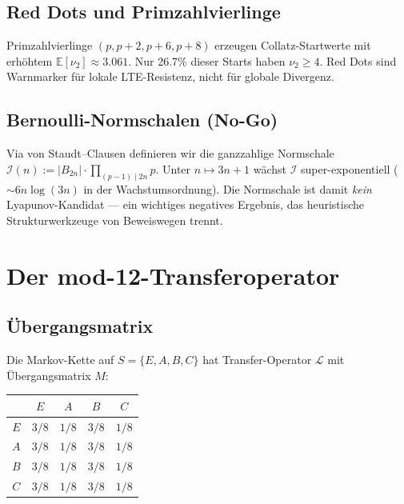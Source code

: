 \documentclass[12pt,a4paper]{article}
\newcommand{\vii}{\nu_2}
\begin{document}
\subsection{Red Dots und Primzahlvierlinge}

Primzahlvierlinge $(p,p+2,p+6,p+8)$ erzeugen Collatz-Startwerte mit
erhöhtem $\mathbb{E}[\vii] \approx 3.061$. Nur 26.7\% dieser Starts haben
$\vii \geq 4$. Red Dots sind Warnmarker für lokale LTE-Resistenz, nicht
für globale Divergenz.

\subsection{Bernoulli-Normschalen (No-Go)}

Via von Staudt--Clausen definieren wir die ganzzahlige Normschale
$\mathcal{I}(n) := |B_{2n}| \cdot \prod_{(p-1)\mid 2n} p$.
Unter $n \mapsto 3n+1$ wächst $\mathcal{I}$ super-exponentiell
($\sim 6n\log(3n)$ in der Wachstumsordnung). Die Normschale ist damit
\emph{kein} Lyapunov-Kandidat --- ein wichtiges negatives Ergebnis,
das heuristische Strukturwerkzeuge von Beweiswegen trennt.

\section{Der mod-12-Transferoperator}
\label{sec:rpf}

\subsection{Übergangsmatrix}

Die Markov-Kette auf $S = \{E,A,B,C\}$ hat Transfer-Operator $\mathcal{L}$
mit Übergangsmatrix $M$:

\begin{center}
\begin{tabular}{c|cccc}
\toprule
 & $E$ & $A$ & $B$ & $C$ \\
\midrule
$E$ & $3/8$ & $1/8$ & $3/8$ & $1/8$ \\
$A$ & $3/8$ & $1/8$ & $3/8$ & $1/8$ \\
$B$ & $3/8$ & $1/8$ & $3/8$ & $1/8$ \\
$C$ & $3/8$ & $1/8$ & $3/8$ & $1/8$ \\
\bottomrule
\end{tabular}
\end{center}
\end{document}
